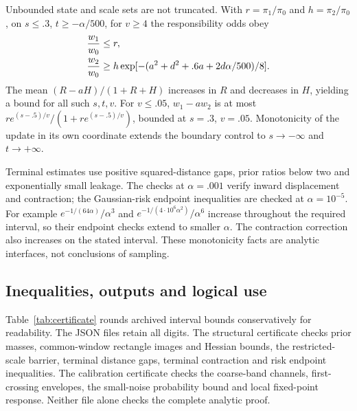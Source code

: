 Unbounded state and scale sets are not truncated. With $r=\pi_1/\pi_0$ and $h=\pi_2/\pi_0$, on $s\le.3$, $t\ge-\alpha/500$, for $v\ge4$ the responsibility odds obey
\begin{align}
{w_1\over w_0}&\le r,\\
{w_2\over w_0}&\ge h\exp[-(a^2+d^2+.6a+2d\alpha/500)/8].
\end{align}
The mean $(R-aH)/(1+R+H)$ increases in $R$ and decreases in $H$, yielding a bound for all such $s,t,v$. For $v\le.05$, $w_1-aw_2$ is at most $r e^{(s-.5)/v}/(1+r e^{(s-.5)/v})$, bounded at $s=.3$, $v=.05$. Monotonicity of the update in its own coordinate extends the boundary control to $s\to-\infty$ and $t\to+\infty$.

Terminal estimates use positive squared-distance gaps, prior ratios below two and exponentially small leakage. The checks at $\alpha=.001$ verify inward displacement and contraction; the Gaussian-risk endpoint inequalities are checked at $\alpha=10^{-5}$. For example $e^{-1/(64\alpha)}/\alpha^3$ and $e^{-1/(4\cdot10^6\alpha^2)}/\alpha^6$ increase throughout the required interval, so their endpoint checks extend to smaller $\alpha$. The contraction correction also increases on the stated interval. These monotonicity facts are analytic interfaces, not conclusions of sampling.

\subsection{Inequalities, outputs and logical use}
Table~\ref{tab:certificate} rounds archived interval bounds conservatively for readability. The JSON files retain all digits. The structural certificate checks prior masses, common-window rectangle images and Hessian bounds, the restricted-scale barrier, terminal distance gaps, terminal contraction and risk endpoint inequalities. The calibration certificate checks the coarse-band channels, first-crossing envelopes, the small-noise probability bound and local fixed-point response. Neither file alone checks the complete analytic proof.

